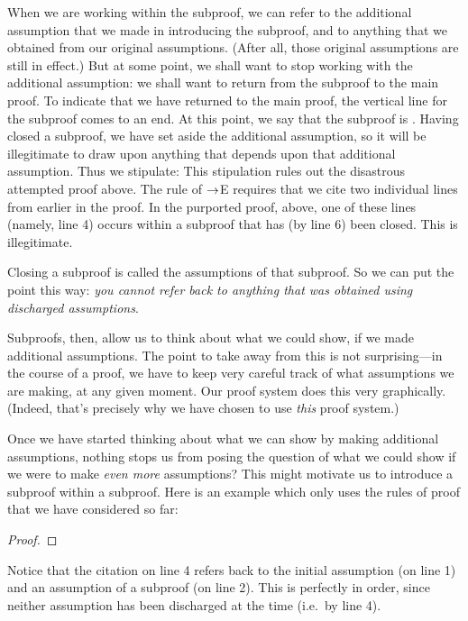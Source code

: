 When we are working within the subproof, we can refer to the additional assumption that we made in introducing the subproof, and to anything that we obtained from our original assumptions. (After all, those original assumptions are still in effect.) But at some point, we shall want to stop working with the additional assumption: we shall want to return from the subproof to the main proof. To indicate that we have returned to the main proof, the vertical line for the subproof comes to an end. At this point, we say that the subproof is . Having closed a subproof, we have set aside the additional assumption, so it will be illegitimate to draw upon anything that depends upon that additional assumption. Thus we stipulate:
This stipulation rules out the disastrous attempted proof above. The rule of $\rightarrow$E requires that we cite two individual lines from earlier in the proof. In the purported proof, above, one of these lines (namely, line 4) occurs within a subproof that has (by line 6) been closed. This is illegitimate. 

Closing a subproof is called  the assumptions of that subproof. So we can put the point this way: \emph{you cannot refer back to anything that was obtained using discharged assumptions}. 

Subproofs, then, allow us to think about what we could show, if we made additional assumptions. The point to take away from this is not surprising---in the course of a proof, we have to keep very careful track of what assumptions we are making, at any given moment. Our proof system does this very graphically. (Indeed, that's precisely why we have chosen to use \emph{this} proof system.)

Once we have started thinking about what we can show by making additional assumptions, nothing stops us from posing the question of what we could show if we were to make \emph{even more} assumptions? This might motivate us to introduce a subproof within a subproof. Here is an example which only uses the rules of proof that we have considered so far:
\begin{proof}
\open
	\open
	\close
\close
{}
\end{proof}
Notice that the citation on line 4 refers back to the initial assumption (on line 1) and an assumption of a subproof (on line 2). This is perfectly in order, since neither assumption has been discharged at the time (i.e.\ by line 4).

